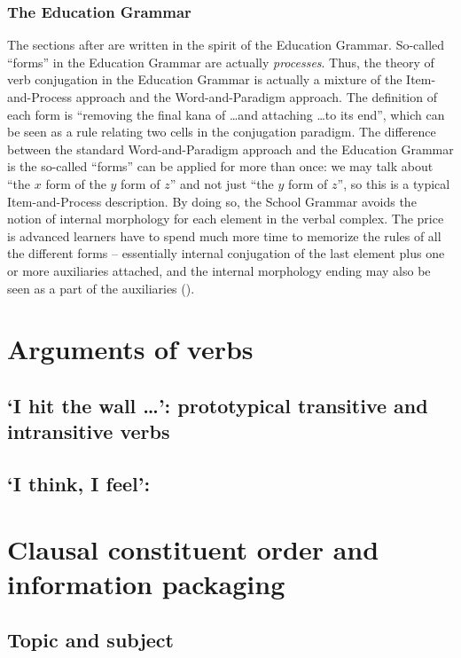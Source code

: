 \documentclass[UTF8, a4paper, oneside, scheme=plain]{ctexrep}
\newcommand{\translate}[1]{`#1'}
\begin{document}
\subsection{The Education Grammar}

The sections after  are written in the spirit of the Education Grammar.
So-called ``forms'' in the Education Grammar are actually \emph{processes}.
Thus, the theory of verb conjugation in the Education Grammar 
is actually a mixture of the Item-and-Process approach and the Word-and-Paradigm approach.
The definition of each form is 
``removing the final kana of \dots and attaching \dots to its end'',
which can be seen as a rule relating two cells in the conjugation paradigm.
The difference between the standard Word-and-Paradigm approach and the Education Grammar 
is the so-called ``forms'' can be applied for more than once:
we may talk about ``the $x$ form of the $y$ form of $z$''
and not just ``the $y$ form of $z$'',
so this is a typical Item-and-Process description.
By doing so, the School Grammar avoids 
the notion of internal morphology for each element in the verbal complex.
The price is advanced learners have to spend much more time to memorize the rules of all the different forms 
-- essentially internal conjugation of the last element plus one or more auxiliaries attached,
and the internal morphology ending may also be seen as a part of the auxiliaries 
().

\chapter{Arguments of verbs}\label{chap:arguments}

\section{\translate{I hit the wall \dots}: prototypical transitive and intransitive verbs}

\section{\translate{I think, I feel}: }

\chapter{Clausal constituent order and information packaging}

\section{Topic and subject}\label{sec:topic-subject}
\end{document}
